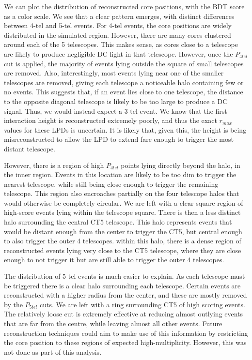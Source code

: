 \documentclass[11pt]{article}
\begin{document}
We can plot the distribution of reconstructed core positions, with the BDT score as a color scale. We see that a clear pattern emerges, with distinct differences between 4-tel and 5-tel events. For 4-tel events, the core positions are widely distributed in the simulated region. However, there are many cores clustered around each of the 5 telescopes. This makes sense, as cores close to a telescope are likely to produce negligible DC light in that telescope. However, once the $P_{4tel}$ cut is applied, the majority of events lying outside the square of small telescopes are removed. Also, interestingly, most events lying near one of the smaller telescopes are removed, giving each telescope a noticeable halo containing few or no events. This suggests that, if an event lies close to one telescope, the distance to the opposite diagonal telescope is likely to be too large to produce a DC signal. Thus, we would instead expect a 3-tel event. We know that the first interaction height is reconstructed extremely poorly, and thus the exact $r_{max}$ values for these LPDs is uncertain. It is likely that, given this, the height is being misreconstructed to allow the LPD to extend fare enough to trigger the most distant telescope. 

However, there is a region of high $P_{4tel}$ points lying directly beyond the halo, in the inner region. Events in this location are likely to be too dim to trigger the nearest telescope, while still being close enough to trigger the remaining telescope. This region also encroaches partially on the four telescope halos that would otherwise be completely circular. We are left with a clear square region of high-score events lying within the telescope square. There is then a less distinct halo surrounding the central CT5 telescope. This halo represents events that would be distant enough from the center to trigger the CT5, but central enough to also trigger the outer 4 telescopes. within this halo, there is a dense region of reconstructed events lying very close to the CT5 telescope, where they are close enough to not trigger it but are still able to trigger the outer 4 telescopes.

The distribution of 5-tel events is much easier to explain. As each telescope must be triggered there is a clear halo surrounding each telescope. Certain events are reconstructed with a higher radius from the center, and these are mostly removed by the $P_{5tel}$ cuts. We are left with a ring surrounding CT5 of high scoring events. The relatively loose cut is extremely effective at reducing almost outlying events that are far from the centre, while leaving almost all other events. Future reconstruction techniques could aim to make use of this information by restricting the core position to these regions of expected high-multiplicity. However, this was not done as part of this analysis. 
\end{document}
